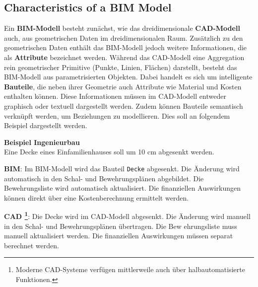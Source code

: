 \subsection{Characteristics of a BIM Model}
\begin{German}
    Ein \textbf{BIM-Modell} besteht zunächst, wie das dreidimensionale \textbf{CAD-Modell} auch, aus geometrischen Daten im dreidimensionalen Raum. Zusätzlich zu den geometrischen Daten enthält das BIM-Modell jedoch weitere Informationen, die als \textbf{Attribute} bezeichnet werden. Während das CAD-Modell eine Aggregation rein geometrischer Primitive (Punkte, Linien, Flächen) darstellt, besteht das BIM-Modell aus parametrisierten Objekten. Dabei handelt es sich um intelligente \textbf{Bauteile}, die neben ihrer Geometrie auch Attribute wie Material und Kosten enthalten können. Diese Informationen müssen im CAD-Modell entweder graphisch oder textuell dargestellt werden. Zudem können Bauteile semantisch verknüpft werden, um Beziehungen zu modellieren. Dies soll an folgendem Beispiel dargestellt werden. \cite{astourLehrbuchGrundlagenBIMArbeitsmethode2022} \\
    
    \begin{itshape}
    \textbf{Beispiel Ingenieurbau}\\
    Eine Decke eines Einfamilienhauses soll um 10 cm abgesenkt werden.

    \textbf{BIM}: Im BIM-Modell wird das Bauteil \texttt{Decke} abgesenkt. Die Änderung wird automatisch in den Schal- und Bewehrungsplänen abgebildet. Die Bewehrungsliste wird automatisch aktualisiert. Die finanziellen Auswirkungen können direkt über eine Kostenberechnung ermittelt werden.

    \textbf{CAD \footnote{Moderne CAD-Systeme verfügen mittlerweile auch über halbautomatisierte Funktionen.}}: Die Decke wird im CAD-Modell abgesenkt. Die Änderung wird manuell in den Schal- und Bewehrungsplänen übertragen. Die Bew
    ehrungsliste muss manuell aktualisiert werden. Die finanziellen Auswirkungen müssen separat berechnet werden.
    \end{itshape}
\end{German}

